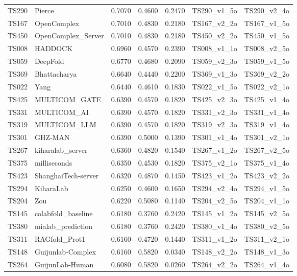\begin{table}[ht]
{\begin{tabular}{llrrrll}
TS290 & Pierce & 0.7070 & 0.4600 & 0.2470 & TS290\_v1\_5o & TS290\_v2\_4o \\ 
TS167 & OpenComplex & 0.7010 & 0.4830 & 0.2180 & TS167\_v2\_2o & TS167\_v1\_5o \\ 
TS450 & OpenComplex\_Server & 0.7010 & 0.4830 & 0.2180 & TS450\_v2\_2o & TS450\_v1\_5o \\ 
TS008 & HADDOCK & 0.6960 & 0.4570 & 0.2390 & TS008\_v1\_1o & TS008\_v2\_5o \\ 
TS059 & DeepFold & 0.6770 & 0.4680 & 0.2090 & TS059\_v2\_3o & TS059\_v1\_5o \\ 
TS369 & Bhattacharya & 0.6640 & 0.4440 & 0.2200 & TS369\_v1\_3o & TS369\_v2\_2o \\ 
TS022 & Yang & 0.6440 & 0.4610 & 0.1830 & TS022\_v1\_5o & TS022\_v2\_1o \\ 
TS425 & MULTICOM\_GATE & 0.6390 & 0.4570 & 0.1820 & TS425\_v2\_3o & TS425\_v1\_4o \\ 
TS331 & MULTICOM\_AI & 0.6390 & 0.4570 & 0.1820 & TS331\_v2\_3o & TS331\_v1\_4o \\ 
TS319 & MULTICOM\_LLM & 0.6390 & 0.4570 & 0.1820 & TS319\_v2\_3o & TS319\_v1\_4o \\ 
TS301 & GHZ-MAN & 0.6390 & 0.5000 & 0.1390 & TS301\_v1\_4o & TS301\_v2\_1o \\ 
TS267 & kiharalab\_server & 0.6360 & 0.4820 & 0.1540 & TS267\_v1\_2o & TS267\_v2\_5o \\ 
TS375 & milliseconds & 0.6350 & 0.4530 & 0.1820 & TS375\_v2\_1o & TS375\_v1\_4o \\ 
TS423 & ShanghaiTech-server & 0.6320 & 0.4870 & 0.1450 & TS423\_v1\_2o & TS423\_v2\_2o \\ 
TS294 & KiharaLab & 0.6250 & 0.4600 & 0.1650 & TS294\_v2\_4o & TS294\_v1\_5o \\ 
TS204 & Zou & 0.6220 & 0.5080 & 0.1140 & TS204\_v2\_5o & TS204\_v1\_1o \\ 
TS145 & colabfold\_baseline & 0.6180 & 0.3760 & 0.2420 & TS145\_v1\_2o & TS145\_v2\_5o \\ 
TS380 & mialab\_prediction & 0.6180 & 0.3760 & 0.2420 & TS380\_v1\_4o & TS380\_v2\_5o \\ 
TS311 & RAGfold\_Prot1 & 0.6160 & 0.4720 & 0.1440 & TS311\_v1\_2o & TS311\_v2\_1o \\ 
TS148 & Guijunlab-Complex & 0.6160 & 0.5820 & 0.0340 & TS148\_v2\_2o & TS148\_v1\_3o \\ 
TS264 & GuijunLab-Human & 0.6080 & 0.5820 & 0.0260 & TS264\_v2\_2o & TS264\_v1\_4o \\ 

\end{tabular}}
\end{table}
